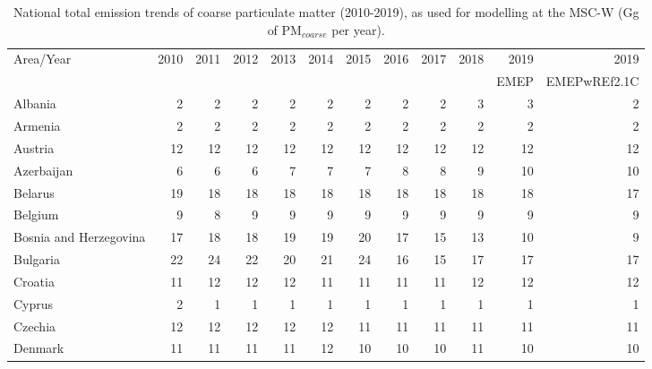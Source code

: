  \begin{table}
  \caption{National total emission trends of coarse particulate matter (2010-2019), as used for modelling at the MSC-W (Gg of PM$_{coarse}$ per year).}
 
 \vspace{15pt}
 
 \scriptsize
 \centering
 \begin{tabular}{|l|r|r|r|r|r|r|r|r|r|r|r|}
 \hline
                     Area/Year&   2010&   2011&   2012&   2013&   2014&   2015&   2016&   2017&   2018&   2019& 2019 \\
                &&&&&&&&&&{\tiny EMEP}&{\tiny EMEPwREf2.1C}\\\hline\hline
                       Albania&      2&      2&      2&      2&      2&      2&      2&      2&      3&      3&      2\\\hline
                       Armenia&      2&      2&      2&      2&      2&      2&      2&      2&      2&      2&      2\\\hline
                       Austria&     12&     12&     12&     12&     12&     12&     12&     12&     12&     12&     12\\\hline
                    Azerbaijan&      6&      6&      6&      7&      7&      7&      8&      8&      9&     10&     10\\\hline
                       Belarus&     19&     18&     18&     18&     18&     18&     18&     18&     18&     18&     17\\\hline
                       Belgium&      9&      8&      9&      9&      9&      9&      9&      9&      9&      9&      9\\\hline
        Bosnia and Herzegovina&     17&     18&     18&     19&     19&     20&     17&     15&     13&     10&      9\\\hline
                      Bulgaria&     22&     24&     22&     20&     21&     24&     16&     15&     17&     17&     17\\\hline
                       Croatia&     11&     12&     12&     12&     11&     11&     11&     11&     12&     12&     12\\\hline
                        Cyprus&      2&      1&      1&      1&      1&      1&      1&      1&      1&      1&      1\\\hline
                       Czechia&     12&     12&     12&     12&     12&     11&     11&     11&     11&     11&     11\\\hline
                       Denmark&     11&     11&     11&     11&     12&     10&     10&     10&     11&     10&     10\\\hline

\end{tabular}
\end{table}

